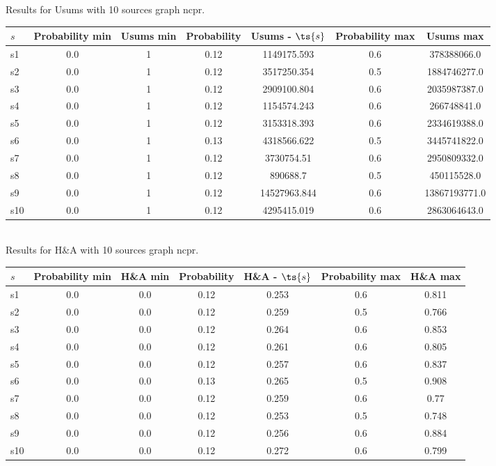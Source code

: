 \documentclass{article}
\begin{document}
\noindent Results for Usums with 10 sources graph ncpr.

\noindent\begin{tabular}{|l|c|c|c|c|c|c|}
\hline
$s$& Probability min & Usums min & Probability & Usums - $\ts{s}$ & Probability max & Usums max\\
\hline
s1 &0.0 & 1 & 0.12 & 1149175.593 & 0.6 & 378388066.0\\
\hline
s2 &0.0 & 1 & 0.12 & 3517250.354 & 0.5 & 1884746277.0\\
\hline
s3 &0.0 & 1 & 0.12 & 2909100.804 & 0.6 & 2035987387.0\\
\hline
s4 &0.0 & 1 & 0.12 & 1154574.243 & 0.6 & 266748841.0\\
\hline
s5 &0.0 & 1 & 0.12 & 3153318.393 & 0.6 & 2334619388.0\\
\hline
s6 &0.0 & 1 & 0.13 & 4318566.622 & 0.5 & 3445741822.0\\
\hline
s7 &0.0 & 1 & 0.12 & 3730754.51 & 0.6 & 2950809332.0\\
\hline
s8 &0.0 & 1 & 0.12 & 890688.7 & 0.5 & 450115528.0\\
\hline
s9 &0.0 & 1 & 0.12 & 14527963.844 & 0.6 & 13867193771.0\\
\hline
s10 &0.0 & 1 & 0.12 & 4295415.019 & 0.6 & 2863064643.0\\
\hline
\end{tabular}\\

\noindent Results for H\&A with 10 sources graph ncpr.

\noindent\begin{tabular}{|l|c|c|c|c|c|c|}
\hline
$s$& Probability min & H\&A min & Probability & H\&A - $\ts{s}$ & Probability max & H\&A max\\
\hline
s1 &0.0 & 0.0 & 0.12 & 0.253 & 0.6 & 0.811\\
\hline
s2 &0.0 & 0.0 & 0.12 & 0.259 & 0.5 & 0.766\\
\hline
s3 &0.0 & 0.0 & 0.12 & 0.264 & 0.6 & 0.853\\
\hline
s4 &0.0 & 0.0 & 0.12 & 0.261 & 0.6 & 0.805\\
\hline
s5 &0.0 & 0.0 & 0.12 & 0.257 & 0.6 & 0.837\\
\hline
s6 &0.0 & 0.0 & 0.13 & 0.265 & 0.5 & 0.908\\
\hline
s7 &0.0 & 0.0 & 0.12 & 0.259 & 0.6 & 0.77\\
\hline
s8 &0.0 & 0.0 & 0.12 & 0.253 & 0.5 & 0.748\\
\hline
s9 &0.0 & 0.0 & 0.12 & 0.256 & 0.6 & 0.884\\
\hline
s10 &0.0 & 0.0 & 0.12 & 0.272 & 0.6 & 0.799\\
\hline
\end{tabular}\\
\end{document}

